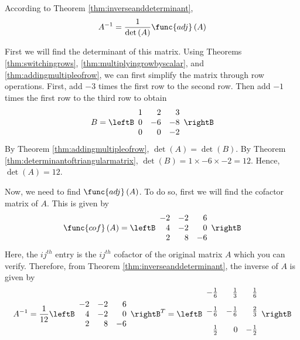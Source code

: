 \begin{solution} 
According to Theorem \ref{thm:inverseanddeterminant}, 
\begin{equation*}
A^{-1} = \frac{1}{\det \left(A\right)} \func{adj}\left(A\right)
\end{equation*}

First we will find the determinant of this matrix. Using Theorems \ref{thm:switchingrows}, \ref{thm:multiplyingrowbyscalar},
and \ref{thm:addingmultipleofrow}, we can first simplify the matrix through row operations. First, add $-3$ times the first row to the second row. Then
add $-1$ times the first row to the third row to obtain
\begin{equation*}
B = \leftB
\begin{array}{rrr}
1 & 2 & 3 \\
0 & -6 & -8 \\
0 & 0 & -2
\end{array}
\rightB
\end{equation*}
By Theorem \ref{thm:addingmultipleofrow}, $\det \left(A\right) = \det \left(B\right)$. By Theorem \ref{thm:determinantoftriangularmatrix}, 
$\det \left(B\right) = 1 \times -6 \times -2 = 12$. Hence, $\det \left(A\right) = 12$. 

Now, we need to find $\func{adj} \left(A\right)$. To do so, first we will find the cofactor matrix of $A$. 
This is given by
\begin{equation*}
\func{cof}\left( A\right) 
=
\leftB
\begin{array}{rrr}
-2 & -2 & 6 \\
4 & -2 & 0 \\
2 & 8 & -6
\end{array}
\rightB 
\end{equation*}
Here, the $ij^{th}$ entry is the $ij^{th}$ cofactor of the original matrix $A$ which you can verify. Therefore, from Theorem \ref{thm:inverseanddeterminant},
 the inverse of $A$ is given by 
\begin{equation*}
A^{-1}
=
\vspace{0.05in}\frac{1}{12}\leftB
\begin{array}{rrr}
-2 & -2 & 6 \\
4 & -2 & 0 \\
2 & 8 & -6
\end{array}
\rightB ^{T}=\allowbreak \leftB
\begin{array}{rrr}
-\vspace{0.05in}\frac{1}{6} & \vspace{0.05in}\frac{1}{3} & \vspace{0.05in}
\frac{1}{6} \\
-\vspace{0.05in}\frac{1}{6} & -\vspace{0.05in}\frac{1}{6} & \vspace{0.05in}
\frac{2}{3} \\
\vspace{0.05in}\frac{1}{2} & 0 & -\vspace{0.05in}\frac{1}{2}
\end{array}
\rightB 
\end{equation*}


\end{solution}
